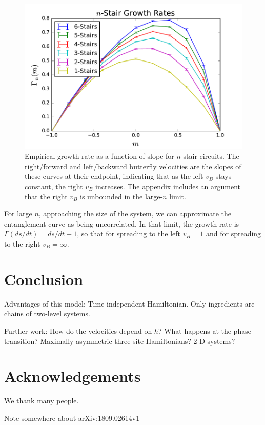 \documentclass[aps,prl,reprint,superscriptaddress, longbibliography]{revtex4-1}
\newcommand{\charlie}[1]{ {\color{Magenta} {{#1}}}}
\begin{document}
\begin{figure}
	\includegraphics[width=\columnwidth]{compareRates.pdf}
	\caption{Empirical growth rate as a function of slope for $n$-stair circuits. The right/forward and left/backward butterfly velocities are the slopes of these curves at their endpoint, indicating that as the left $v_B$ stays constant, the right $v_B$ increases. The appendix includes an argument that the right $v_B$ is unbounded in the large-$n$ limit.}
	\label{fig:compareRates}
\end{figure}	

For large $n$, approaching the size of the system, we can approximate the entanglement curve as being uncorrelated. In that limit, the growth rate is $\Gamma(ds/dt) = ds/dt+1$, so that for spreading to the left $v_B=1$ and for spreading to the right $v_B=\infty$.

\section{Conclusion}

Advantages of this model:
Time-independent Hamiltonian.
Only ingredients are chains of two-level systems.

Further work:
How do the velocities depend on $h$?
What happens at the phase transition?
Maximally asymmetric three-site Hamiltonians?
2-D systems?


\section*{Acknowledgements}
We thank many people.

\charlie{Note somewhere about arXiv:1809.02614v1}



\begin{appendix}


\end{appendix}
\end{document}
